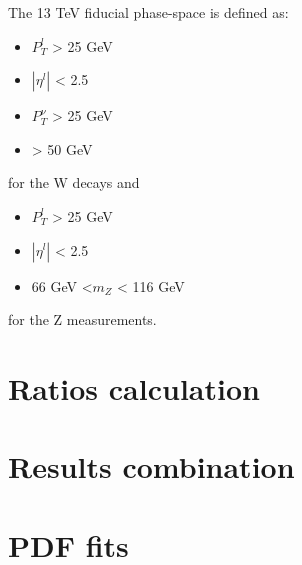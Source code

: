 The 13 TeV fiducial phase-space is defined as:
\begin{itemize}
\item $P_T^l$ > 25 GeV
\item $|\eta^l|$ < 2.5 
\item $P_T^{\nu}$ > 25 GeV
\item \mtw > 50 GeV
\end{itemize}
for the W decays and 
\begin{itemize}
\item $P_T^l$ > 25 GeV
\item $|\eta^l|$ < 2.5 
\item 66 GeV <$m_{Z}$ < 116 GeV
\end{itemize}
for the Z measurements.

\section{Ratios calculation}
\section{Results combination}\label{sec:Aver}
\section{PDF fits}